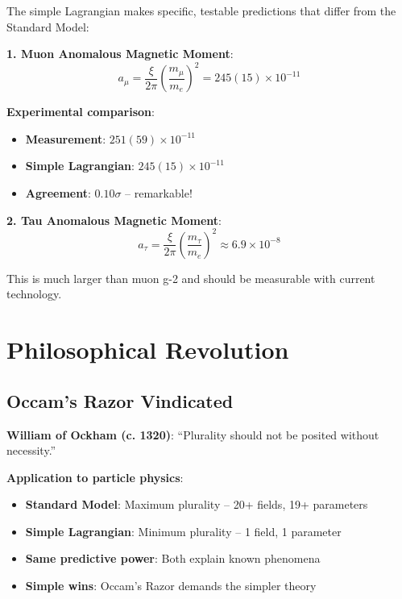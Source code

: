 \documentclass[12pt,a4paper]{article}
\newcommand{\xipar}{\xi}
\theoremstyle{definition}
\theoremstyle{remark}
\begin{document}
	The simple Lagrangian makes specific, testable predictions that differ from the Standard Model:
	
	\textbf{1. Muon Anomalous Magnetic Moment}:
	\begin{equation}
		a_{\mu} = \frac{\xipar}{2\pi} \left(\frac{m_{\mu}}{m_e}\right)^2 = 245(15) \times 10^{-11}
	\end{equation}
	
	\textbf{Experimental comparison}:
	\begin{itemize}
		\item \textbf{Measurement}: $251(59) \times 10^{-11}$
		\item \textbf{Simple Lagrangian}: $245(15) \times 10^{-11}$
		\item \textbf{Agreement}: $0.10\sigma$ -- remarkable!
	\end{itemize}
	
	\textbf{2. Tau Anomalous Magnetic Moment}:
	\begin{equation}
		a_{\tau} = \frac{\xipar}{2\pi} \left(\frac{m_{\tau}}{m_e}\right)^2 \approx 6.9 \times 10^{-8}
	\end{equation}
	
	This is much larger than muon g-2 and should be measurable with current technology.
	
	\section{Philosophical Revolution}
	
	\subsection{Occam's Razor Vindicated}
	
	\begin{tcolorbox}[colback=blue!5!white,colframe=blue!75!black,title=Occam's Razor in Pure Form]
		\textbf{William of Ockham (c. 1320)}: ``Plurality should not be posited without necessity.''
		
		\textbf{Application to particle physics}:
		\begin{itemize}
			\item \textbf{Standard Model}: Maximum plurality -- 20+ fields, 19+ parameters
			\item \textbf{Simple Lagrangian}: Minimum plurality -- 1 field, 1 parameter
			\item \textbf{Same predictive power}: Both explain known phenomena
			\item \textbf{Simple wins}: Occam's Razor demands the simpler theory
		\end{itemize}
	\end{tcolorbox}
	
\end{document}
